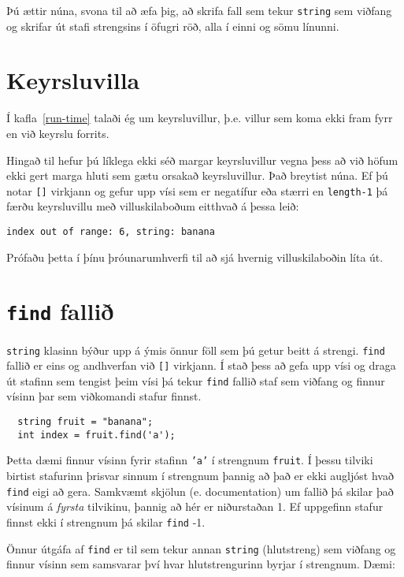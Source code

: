 Þú ættir núna, svona til að æfa þig, að skrifa fall sem tekur {\tt string} sem viðfang og skrifar út stafi strengsins í öfugri röð, alla í einni og sömu línunni.

\section{Keyrsluvilla}

Í kafla~\ref{run-time} talaði ég um keyrsluvillur, þ.e. villur sem koma ekki fram fyrr en við keyrslu forrits.

Hingað til hefur þú líklega ekki séð margar keyrsluvillur vegna þess að við höfum ekki gert marga hluti sem gætu orsakað keyrsluvillur.
Það breytist núna.
Ef þú notar {\tt []} virkjann og gefur upp vísi sem er negatífur eða stærri en {\tt length-1} þá færðu keyrsluvillu með villuskilaboðum eitthvað á þessa leið:

\begin{verbatim}
index out of range: 6, string: banana
\end{verbatim}
%
Prófaðu þetta í þínu þróunarumhverfi til að sjá hvernig villuskilaboðin líta út.

\section{{\tt find} fallið}

{\tt string} klasinn býður upp á ýmis önnur föll sem þú getur beitt á strengi.
{\tt find} fallið er eins og andhverfan við {\tt []} virkjann.
Í stað þess að gefa upp vísi og draga út stafinn sem tengist þeim vísi þá tekur {\tt find} fallið staf sem viðfang
og finnur vísinn þar sem viðkomandi stafur finnst.

\begin{verbatim}
  string fruit = "banana";
  int index = fruit.find('a');
\end{verbatim}
%
Þetta dæmi finnur vísinn fyrir stafinn {\tt 'a'} í strengnum {\tt fruit}.
Í þessu tilviki birtist stafurinn þrisvar sinnum í strengnum þannig að það er ekki augljóst hvað {\tt find} eigi að gera.
Samkvæmt skjölun (e. documentation) um fallið þá skilar það vísinum á {\em fyrsta} tilvikinu, þannig að hér er niðurstaðan 1.
Ef uppgefinn stafur finnst ekki í strengnum þá skilar {\tt find} -1.

Önnur útgáfa af {\tt find} er til sem tekur annan {\tt string} (hlutstreng) sem viðfang og finnur vísinn sem samsvarar því hvar hlutstrengurinn byrjar í strengnum.
Dæmi:

